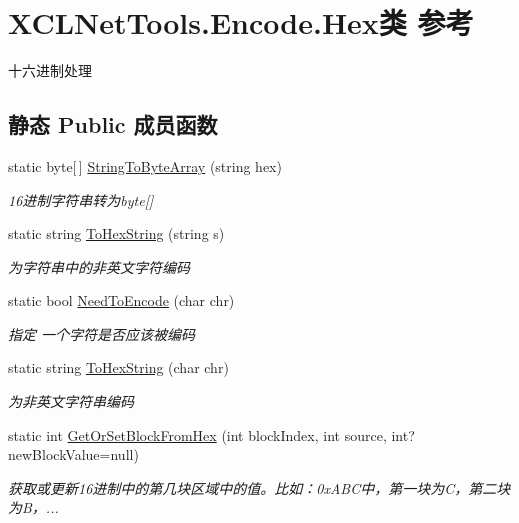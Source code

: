 \hypertarget{class_x_c_l_net_tools_1_1_encode_1_1_hex}{\section{X\-C\-L\-Net\-Tools.\-Encode.\-Hex类 参考}
\label{class_x_c_l_net_tools_1_1_encode_1_1_hex}
}


十六进制处理  


\subsection*{静态 Public 成员函数}
\begin{DoxyCompactItemize}
\item 
static byte\mbox{[}$\,$\mbox{]} \hyperlink{class_x_c_l_net_tools_1_1_encode_1_1_hex_a0fb06fdeea06d52883d1f1a93bfcf4e8}{String\-To\-Byte\-Array} (string hex)
\begin{DoxyCompactList}\small\item\em 16进制字符串转为byte\mbox{[}\mbox{]} \end{DoxyCompactList}\item 
static string \hyperlink{class_x_c_l_net_tools_1_1_encode_1_1_hex_a60f888006a88a296a97f8212abd0ddba}{To\-Hex\-String} (string s)
\begin{DoxyCompactList}\small\item\em 为字符串中的非英文字符编码 \end{DoxyCompactList}\item 
static bool \hyperlink{class_x_c_l_net_tools_1_1_encode_1_1_hex_aac3a2883c1182b43cdc0ebd7a5554895}{Need\-To\-Encode} (char chr)
\begin{DoxyCompactList}\small\item\em 指定 一个字符是否应该被编码 \end{DoxyCompactList}\item 
static string \hyperlink{class_x_c_l_net_tools_1_1_encode_1_1_hex_a58fb0c39fe4db08762c074d9d774729d}{To\-Hex\-String} (char chr)
\begin{DoxyCompactList}\small\item\em 为非英文字符串编码 \end{DoxyCompactList}\item 
static int \hyperlink{class_x_c_l_net_tools_1_1_encode_1_1_hex_abe9191a3f762b84c077bba6ef4f6dc30}{Get\-Or\-Set\-Block\-From\-Hex} (int block\-Index, int source, int?new\-Block\-Value=null)
\begin{DoxyCompactList}\small\item\em 获取或更新16进制中的第几块区域中的值。比如：0x\-A\-B\-C中，第一块为\-C，第二块为\-B，... \end{DoxyCompactList}\end{DoxyCompactItemize}


